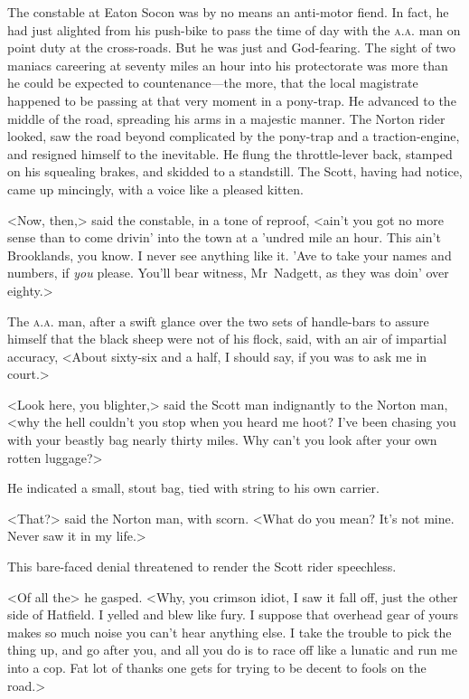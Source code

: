 The constable at Eaton Socon was by no means an anti-motor fiend. In fact, he had just alighted from his push-bike to pass the time of day with the \textsc{a.a.} man on point duty at the cross-roads. But he was just and God-fearing. The sight of two maniacs careering at seventy miles an hour into his protectorate was more than he could be expected to countenance—the more, that the local magistrate happened to be passing at that very moment in a pony-trap. He advanced to the middle of the road, spreading his arms in a majestic manner. The Norton rider looked, saw the road beyond complicated by the pony-trap and a traction-engine, and resigned himself to the inevitable. He flung the throttle-lever back, stamped on his squealing brakes, and skidded to a standstill. The Scott, having had notice, came up mincingly, with a voice like a pleased kitten.

<Now, then,> said the constable, in a tone of reproof, <ain't you got no more sense than to come drivin' into the town at a 'undred mile an hour. This ain't Brooklands, you know. I never see anything like it. 'Ave to take your names and numbers, if \textit{you} please. You'll bear witness, Mr~Nadgett, as they was doin' over eighty.>

The \textsc{a.a.} man, after a swift glance over the two sets of handle-bars to assure himself that the black sheep were not of his flock, said, with an air of impartial accuracy, <About sixty-six and a half, I should say, if you was to ask me in court.>

<Look here, you blighter,> said the Scott man indignantly to the Norton man, <why the hell couldn't you stop when you heard me hoot? I've been chasing you with your beastly bag nearly thirty miles. Why can't you look after your own rotten luggage?>

He indicated a small, stout bag, tied with string to his own carrier.

<That?> said the Norton man, with scorn. <What do you mean? It's not mine. Never saw it in my life.>

This bare-faced denial threatened to render the Scott rider speechless.

<Of all the\longdash> he gasped. <Why, you crimson idiot, I saw it fall off, just the other side of Hatfield. I yelled and blew like fury. I suppose that overhead gear of yours makes so much noise you can't hear anything else. I take the trouble to pick the thing up, and go after you, and all you do is to race off like a lunatic and run me into a cop. Fat lot of thanks one gets for trying to be decent to fools on the road.>

